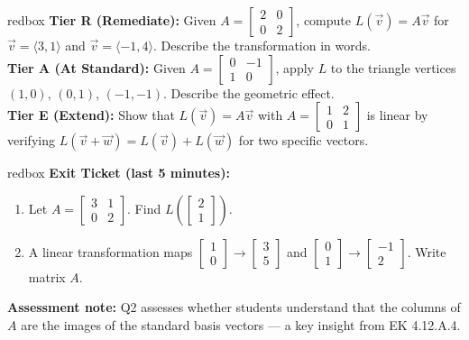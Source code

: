 \documentclass[10pt]{article}
\begin{document}
\begin{skillbox}{redbox}
    \textbf{Tier R (Remediate):} Given $A=\begin{bmatrix}2&0\\0&2\end{bmatrix}$, compute
    $L(\vec{v})=A\vec{v}$ for $\vec{v}=\langle 3,1\rangle$ and $\vec{v}=\langle -1,4\rangle$.
    Describe the transformation in words.\\[4pt]
    \textbf{Tier A (At Standard):} Given $A=\begin{bmatrix}0&-1\\1&0\end{bmatrix}$, apply $L$
    to the triangle vertices $(1,0)$, $(0,1)$, $(-1,-1)$. Describe the geometric effect.\\[4pt]
    \textbf{Tier E (Extend):} Show that $L(\vec{v})=A\vec{v}$ with $A=\begin{bmatrix}1&2\\0&1\end{bmatrix}$
    is linear by verifying $L(\vec{v}+\vec{w})=L(\vec{v})+L(\vec{w})$ for two specific vectors.
\end{skillbox}

\begin{skillbox}{redbox}
    \textbf{Exit Ticket (last 5 minutes):}
    \begin{enumerate}[leftmargin=1.5em, itemsep=2pt]
        \item Let $A=\begin{bmatrix}3&1\\0&2\end{bmatrix}$.  Find $L\!\left(\begin{bmatrix}2\\1\end{bmatrix}\right)$.
        \item A linear transformation maps $\begin{bmatrix}1\\0\end{bmatrix}\to\begin{bmatrix}3\\5\end{bmatrix}$
              and $\begin{bmatrix}0\\1\end{bmatrix}\to\begin{bmatrix}-1\\2\end{bmatrix}$.  Write matrix $A$.
    \end{enumerate}
    \textbf{Assessment note:} Q2 assesses whether students understand that the columns of $A$ are the
    images of the standard basis vectors --- a key insight from EK 4.12.A.4.
\end{skillbox}
\end{document}

